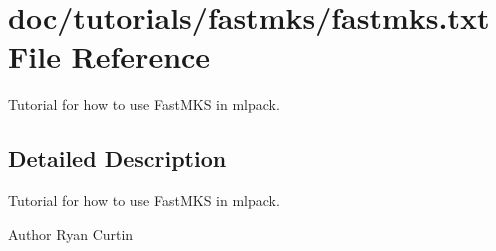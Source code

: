 \section{doc/tutorials/fastmks/fastmks.txt File Reference}
\label{fastmks_8txt}


Tutorial for how to use Fast\+M\+KS in mlpack.  




\subsection{Detailed Description}
Tutorial for how to use Fast\+M\+KS in mlpack. 

\begin{DoxyAuthor}{Author}
Ryan Curtin 
\end{DoxyAuthor}
